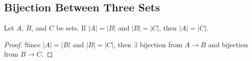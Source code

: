 \subsection{Bijection Between Three Sets}
\label{sub_sec:bijection_between_three_sets}

\begin{theorem}
  Let $A$, $B$, and $C$ be sets. If $\vert A \vert = \vert B \vert$ and $\vert B \vert = \vert C \vert$, then $\vert A \vert = \vert C \vert$.
\end{theorem}
\begin{proof}
  Since $\vert A \vert = \vert B \vert$ and $\vert B \vert = \vert C \vert$,
  then $\exists$ bijection from $A \to B$ and bijection from $B \to C$.
\end{proof}

